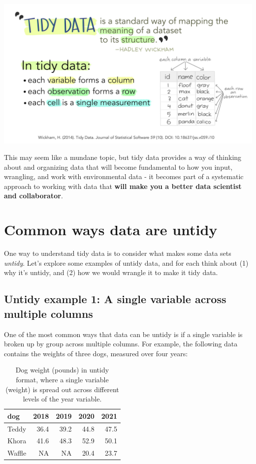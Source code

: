 \documentclass[
]{book}
\begin{document}
\includegraphics[width=6.25in,height=\textheight]{images/tidydata_1.jpg}

This may seem like a mundane topic, but tidy data provides a way of thinking about and organizing data that will become fundamental to how you input, wrangling, and work with environmental data - it becomes part of a systematic approach to working with data that \textbf{will make you a better data scientist and collaborator}.

\hypertarget{common-ways-data-are-untidy}{%
\section{Common ways data are untidy}\label{common-ways-data-are-untidy}}

One way to understand tidy data is to consider what makes some data sets \emph{untidy}. Let's explore some examples of untidy data, and for each think about (1) why it's untidy, and (2) how we would wrangle it to make it tidy data.

\hypertarget{untidy-example-1-a-single-variable-across-multiple-columns}{%
\subsection{Untidy example 1: A single variable across multiple columns}\label{untidy-example-1-a-single-variable-across-multiple-columns}}

One of the most common ways that data can be untidy is if a single variable is broken up by group across multiple columns. For example, the following data contains the weights of three dogs, measured over four years:

\begin{table}

\caption{\label{tab:unnamed-chunk-2}Dog weight (pounds) in untidy format, where a single variable (weight) is spread out across different levels of the year variable.}
\centering
\begin{tabular}[t]{l|r|r|r|r}
\hline
dog & 2018 & 2019 & 2020 & 2021\\
\hline
Teddy & 36.4 & 39.2 & 44.8 & 47.5\\
\hline
Khora & 41.6 & 48.3 & 52.9 & 50.1\\
\hline
Waffle & NA & NA & 20.4 & 23.7\\
\hline
\end{tabular}
\end{table}
\end{document}
